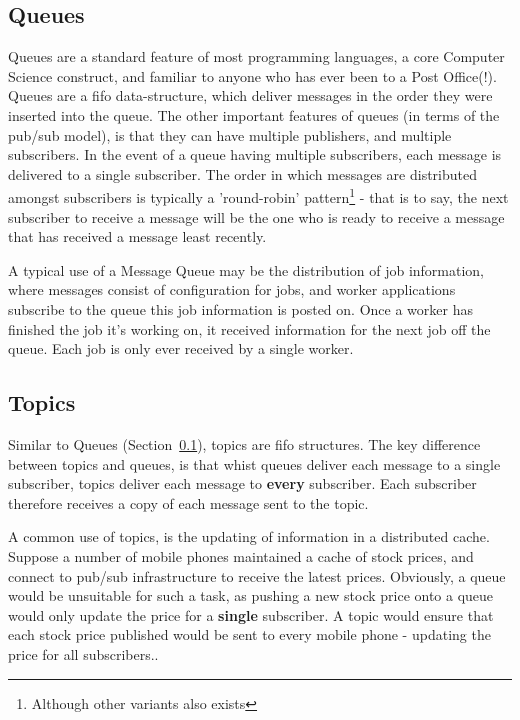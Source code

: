 \subsection{Queues}
\label{sub:queues}

Queues are a standard feature of most programming languages, a core Computer
Science construct, and familiar to anyone who has ever been to a Post Office(!).
Queues are a \gls{fifo} data-structure, which deliver messages in the order
they were inserted into the queue. The other important features of queues (in
terms of the pub/sub model), is that they can have multiple publishers, and
multiple subscribers. In the event of a queue having multiple subscribers, each
message is delivered to a single subscriber.  The order in which messages are
distributed amongst subscribers is typically a 'round-robin'
pattern\footnote{Although other variants also exists} - that is to say, the next
subscriber to receive a message will be the one who is ready to receive a
message that has received a message least recently.

A typical use of a Message Queue may be the distribution of job information,
where messages consist of configuration for jobs, and worker applications
subscribe to the queue this job information is posted on. Once a worker has
finished the job it's working on, it received information for the next job off
the queue. Each job is only ever received by a single worker.

\subsection{Topics}
\label{sub:topics}

Similar to Queues (Section~\ref{sub:queues}), topics are \gls{fifo} structures.
The key difference between topics and queues, is that whist queues deliver each
message to a single subscriber, topics deliver each message to \textbf{every}
subscriber. Each subscriber therefore receives a copy of each message sent to
the topic.

A common use of topics, is the updating of information in a distributed cache.
Suppose a number of mobile phones maintained a cache of stock prices, and
connect to pub/sub infrastructure to receive the latest prices. Obviously, a
queue would be unsuitable for such a task, as pushing a new stock price onto a
queue would only update the price for a \textbf{single} subscriber. A topic
would ensure that each stock price published would be sent to every mobile phone -
updating the price for all subscribers..

